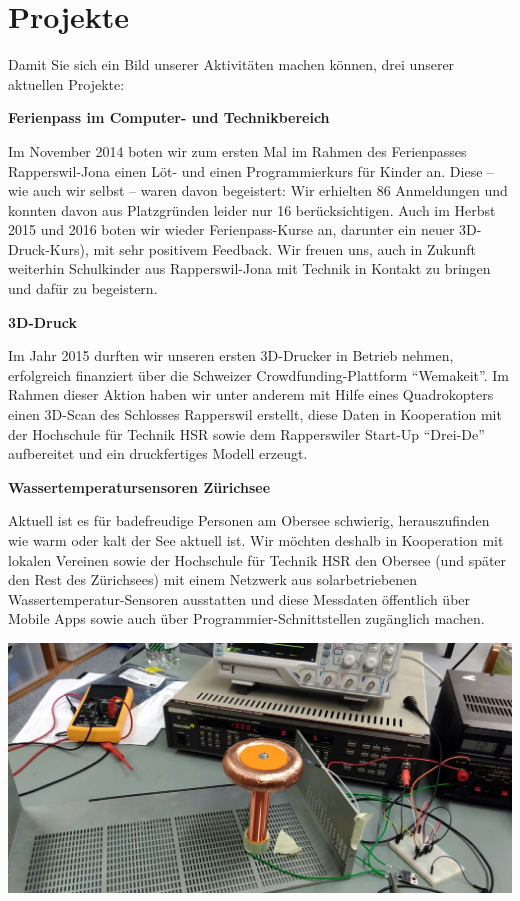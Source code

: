 \documentclass[10pt,a4paper,parskip,fleqn]{scrartcl}
\begin{document}
\section{Projekte}

Damit Sie sich ein Bild unserer Aktivitäten machen können, drei unserer
aktuellen Projekte:

\textbf{Ferienpass im Computer- und Technikbereich}

Im November 2014 boten wir zum ersten Mal im Rahmen des Ferienpasses
Rapperswil-Jona einen Löt- und einen Programmierkurs für Kinder an. Diese -- wie
auch wir selbst -- waren davon begeistert: Wir erhielten 86 Anmeldungen und
konnten davon aus Platzgründen leider nur 16 berücksichtigen. Auch im Herbst
2015 und 2016 boten wir wieder Ferienpass-Kurse an, darunter ein neuer
3D-Druck-Kurs), mit sehr positivem Feedback. Wir freuen uns, auch in Zukunft
weiterhin Schulkinder aus Rapperswil-Jona mit Technik in Kontakt zu bringen und
dafür zu begeistern.

\textbf{3D-Druck}

Im Jahr 2015 durften wir unseren ersten 3D-Drucker in Betrieb nehmen,
erfolgreich finanziert über die Schweizer Crowdfunding-Plattform ``Wemakeit''.
Im Rahmen dieser Aktion haben wir unter anderem mit Hilfe eines Quadrokopters
einen 3D-Scan des Schlosses Rapperswil erstellt, diese Daten in Kooperation mit
der Hochschule für Technik HSR sowie dem Rapperswiler Start-Up ``Drei-De''
aufbereitet und ein druckfertiges Modell erzeugt.

\textbf{Wassertemperatursensoren Zürichsee}

Aktuell ist es für badefreudige Personen am Obersee schwierig, herauszufinden
wie warm oder kalt der See aktuell ist. Wir möchten deshalb in Kooperation mit
lokalen Vereinen sowie der Hochschule für Technik HSR den Obersee (und später
den Rest des Zürichsees) mit einem Netzwerk aus solarbetriebenen
Wassertemperatur-Sensoren ausstatten und diese Messdaten öffentlich über Mobile
Apps sowie auch über Programmier-Schnittstellen zugänglich machen.

\includegraphics[width=\textwidth]{img/tesla.jpg}
\end{document}
